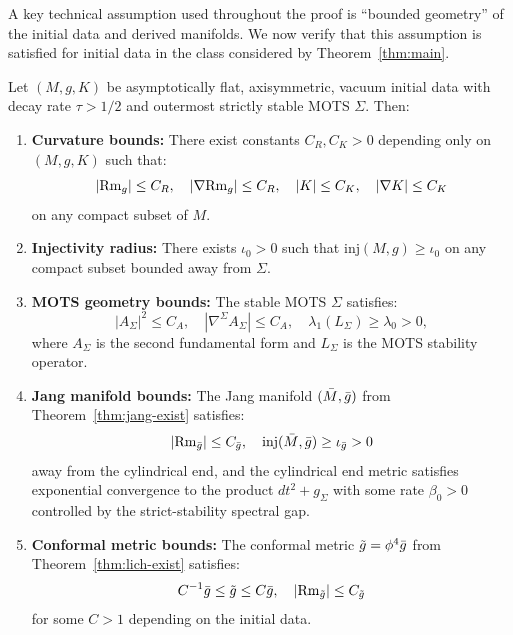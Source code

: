 A key technical assumption used throughout the proof is ``bounded geometry'' of the initial data and derived manifolds. We now verify that this assumption is satisfied for initial data in the class considered by Theorem~\ref{thm:main}.

\begin{lemma}\label{lem:bounded-geometry}
Let $(M, g, K)$ be asymptotically flat, axisymmetric, vacuum initial data with decay rate $\tau > 1/2$ and outermost strictly stable MOTS $\Sigma$. Then:
\begin{enumerate}[label=\textup{(\roman*)}]
    \item \textbf{Curvature bounds:} There exist constants $C_R, C_K > 0$ depending only on $(M, g, K)$ such that:
    \[
    |\mathrm{Rm}_g| \leq C_R, \quad |\nabla \mathrm{Rm}_g| \leq C_R, \quad |K| \leq C_K, \quad |\nabla K| \leq C_K
    \]
    on any compact subset of $M$.
    
    \item \textbf{Injectivity radius:} There exists $\iota_0 > 0$ such that $\mathrm{inj}(M, g) \geq \iota_0$ on any compact subset bounded away from $\Sigma$.
    
    \item \textbf{MOTS geometry bounds:} The stable MOTS $\Sigma$ satisfies:
    \[
    |A_\Sigma|^2 \leq C_A, \quad |\nabla^\Sigma A_\Sigma| \leq C_A, \quad \lambda_1(L_\Sigma) \geq \lambda_0 > 0,
    \]
    where $A_\Sigma$ is the second fundamental form and $L_\Sigma$ is the MOTS stability operator.
    
    \item \textbf{Jang manifold bounds:} The Jang manifold $(\bar{M}, \bar{g})$ from Theorem~\ref{thm:jang-exist} satisfies:
    \[
    |\mathrm{Rm}_{\bar{g}}| \leq C_{\bar{g}}, \quad \mathrm{inj}(\bar{M}, \bar{g}) \geq \iota_{\bar{g}} > 0
    \]
    away from the cylindrical end, and the cylindrical end metric satisfies exponential convergence to the product $dt^2 + g_\Sigma$ with some rate $\beta_0 > 0$ controlled by the strict-stability spectral gap.
    
    \item \textbf{Conformal metric bounds:} The conformal metric $\tilde{g} = \phi^4 \bar{g}$ from Theorem~\ref{thm:lich-exist} satisfies:
    \[
    C^{-1} \bar{g} \leq \tilde{g} \leq C \bar{g}, \quad |\mathrm{Rm}_{\tilde{g}}| \leq C_{\tilde{g}}
    \]
    for some $C > 1$ depending on the initial data.
\end{enumerate}
\end{lemma}

